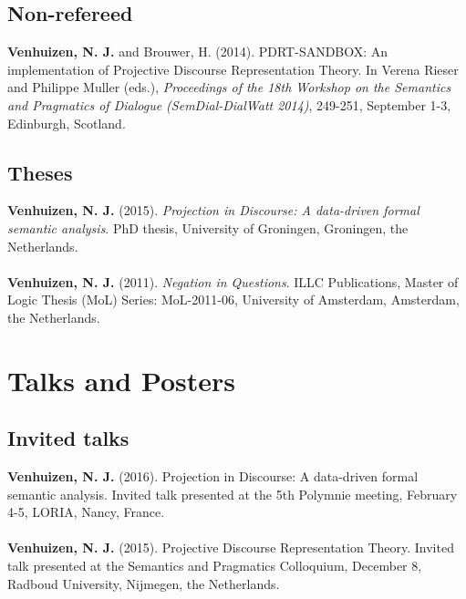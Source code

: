 \documentclass[a4paper,10pt]{article}
\begin{document}
\subsection*{Non-refereed}

\noindent
    \textbf{Venhuizen, N. J.} and Brouwer, H. (2014). PDRT-SANDBOX: An
    implementation of Projective Discourse Representation Theory. In Verena
    Rieser and Philippe Muller (eds.), \textit{Proceedings of the 18th
    Workshop on the Semantics and Pragmatics of Dialogue (SemDial-DialWatt
    2014)}, 249-251, September 1-3, Edinburgh, Scotland.

\subsection*{Theses}

\noindent
    \textbf{Venhuizen, N. J.} (2015). \textit{Projection in Discourse:
      A data-driven formal semantic analysis}. PhD thesis, University of
      Groningen, Groningen, the Netherlands.\\
    \\
    \textbf{Venhuizen, N. J.} (2011). \textit{Negation in Questions}.
      ILLC Publications, Master of Logic Thesis (MoL) Series: MoL-2011-06,
      University of Amsterdam, Amsterdam, the Netherlands.


\section*{Talks and Posters}

    
\subsection*{Invited talks}

\noindent
    \textbf{Venhuizen, N. J.} (2016). Projection in Discourse: A data-driven
    formal semantic analysis. Invited talk presented at the 5th Polymnie
    meeting, February 4-5, LORIA, Nancy, France.\\
    \\
    \textbf{Venhuizen, N. J.} (2015). Projective Discourse Representation
    Theory. Invited talk presented at the Semantics and Pragmatics
    Colloquium, December 8, Radboud University, Nijmegen, the Netherlands.
\end{document}
